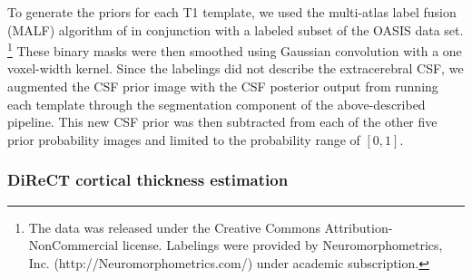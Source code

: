 To generate the priors for each T1 template, we used the multi-atlas label fusion (MALF) 
algorithm of \cite{wang2013} {\color{blue} in conjunction with a labeled subset of the
OASIS data set}.%
\footnote{
{\color{blue}{These data were originally acquired by the first and last
authors to aid in the MICCAI 2012 Grand Challenge and Workshop on Multi-Atlas Labeling.}}
The data was released under the Creative Commons Attribution-NonCommercial license. 
Labelings were provided by Neuromorphometrics, Inc. (http://Neuromorphometrics.com/) 
under academic subscription. 
}
{\color{blue}{First, we normalized the labeled OASIS subset to the template.  
We then performed MALF on the template using the normalized labeled
data as input.  This resulted in a labeled, parcellated template consisting of 100+
labels defining the different brain regions.  We then condensed this template-specific
labeling to the six needed for our analysis, viz., cerebrospinal fluid (CSF), 
gray matter (GM), white matter (WM), deep gray matter, brain stem, and cerebellum.  
For example, all cortical regions were assigned a single label representing the gray matter. 
}}
These binary
masks were then smoothed using Gaussian convolution with a one voxel-width kernel.  Since the labelings did not describe the extracerebral
CSF, we augmented the CSF prior image with the CSF posterior output from running each template 
through the segmentation component of the above-described pipeline.  
This new CSF prior was then subtracted from each of the other five prior probability images
and limited to the probability range of $[0,1]$.  {}


\subsubsection{DiReCT cortical thickness estimation}

